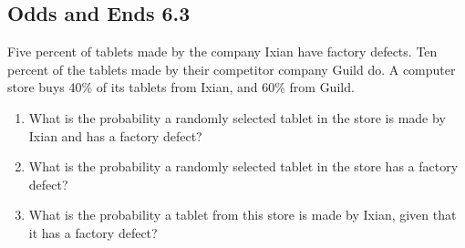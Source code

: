 \documentclass[
  11pt,
]{article}
\providecommand{\tightlist}{%
  \setlength{\itemsep}{0pt}\setlength{\parskip}{0pt}}
\begin{document}
\hypertarget{odds-and-ends-6.3}{%
\subsection{Odds and Ends 6.3}\label{odds-and-ends-6.3}}

Five percent of tablets made by the company Ixian have factory defects.
Ten percent of the tablets made by their competitor company Guild do. A
computer store buys 40\% of its tablets from Ixian, and 60\% from Guild.

\begin{enumerate}
\def\labelenumi{\alph{enumi}.}
\tightlist
\item
  What is the probability a randomly selected tablet in the store is
  made by Ixian and has a factory defect?
\item
  What is the probability a randomly selected tablet in the store has a
  factory defect?
\item
  What is the probability a tablet from this store is made by Ixian,
  given that it has a factory defect?
\end{enumerate}
\end{document}
